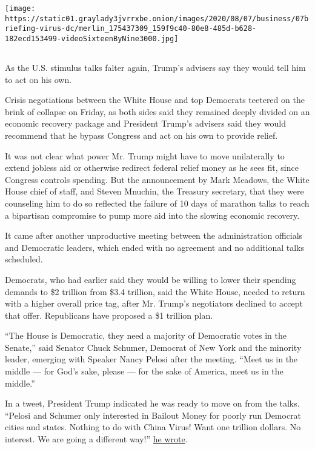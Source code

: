 \texttt{[image: https://static01.graylady3jvrrxbe.onion/images/2020/08/07/business/07briefing-virus-dc/merlin\_175437309\_159f9c40-80e8-485d-b628-182ecd153499-videoSixteenByNine3000.jpg]}

\subsection{}

As the U.S. stimulus talks falter again, Trump's advisers say they would
tell him to act on his own.

Crisis negotiations between the White House and top Democrats teetered
on the brink of collapse on Friday, as both sides said they remained
deeply divided on an economic recovery package and President Trump's
advisers said they would recommend that he bypass Congress and act on
his own to provide relief.

It was not clear what power Mr. Trump might have to move unilaterally to
extend jobless aid or otherwise redirect federal relief money as he sees
fit, since Congress controls spending. But the announcement by Mark
Meadows, the White House chief of staff, and Steven Mnuchin, the
Treasury secretary, that they were counseling him to do so reflected the
failure of 10 days of marathon talks to reach a bipartisan compromise to
pump more aid into the slowing economic recovery.

It came after another unproductive meeting between the administration
officials and Democratic leaders, which ended with no agreement and no
additional talks scheduled.

Democrats, who had earlier said they would be willing to lower their
spending demands to \$2 trillion from \$3.4 trillion, said the White
House, needed to return with a higher overall price tag, after Mr.
Trump's negotiators declined to accept that offer. Republicans have
proposed a \$1 trillion plan.

``The House is Democratic, they need a majority of Democratic votes in
the Senate,'' said Senator Chuck Schumer, Democrat of New York and the
minority leader, emerging with Speaker Nancy Pelosi after the meeting.
``Meet us in the middle --- for God's sake, please --- for the sake of
America, meet us in the middle.''

In a tweet, President Trump indicated he was ready to move on from the
talks. ``Pelosi and Schumer only interested in Bailout Money for poorly
run Democrat cities and states. Nothing to do with China Virus! Want one
trillion dollars. No interest. We are going a different way!''
\href{https://twitter.com/realDonaldTrump/status/1291842540023558146?s=20}{he
wrote}.

